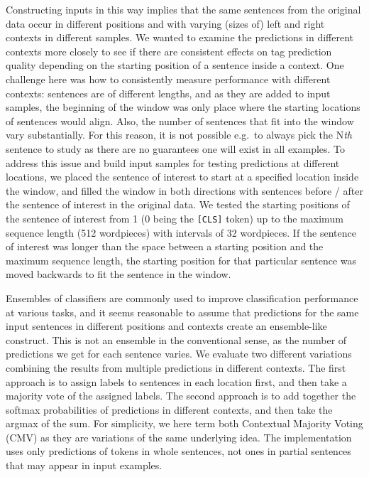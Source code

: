 Constructing inputs in this way implies that the same sentences from the original data occur in different positions and with varying (sizes of) left and right contexts in different samples. We wanted to examine the predictions in different contexts more closely to see if there are consistent effects on tag prediction quality depending on the starting position of a sentence inside a context. One challenge here was how to consistently measure performance with different contexts: sentences are of different lengths, and as they are added to input samples, the beginning of the window was only place where the starting locations of sentences would align. Also, the number of sentences that fit into the window vary substantially. For this reason, it is not possible e.g.\ to always pick the N\emph{th} sentence to study as there are no guarantees one will exist in all examples. To address this issue and build input samples for testing predictions at different locations, we placed the sentence of interest to start at a specified location inside the window, and filled the window in both directions with sentences before / after the sentence of interest in the original data. We tested the starting positions of the sentence of interest from 1 (0 being the \texttt{[CLS]} token) up to the maximum sequence length (512 wordpieces) with intervals of 32 wordpieces. If the sentence of interest was longer than the space between a starting position and the maximum sequence length, the starting position for that particular sentence was moved backwards to fit the sentence in the window. 

Ensembles of classifiers are commonly used to improve classification performance at various tasks, and it seems reasonable to assume that predictions for the same input sentences in different positions and contexts create an ensemble-like construct. This is not an ensemble in the conventional sense, as the number of predictions we get for each sentence varies.
We evaluate two different variations combining the results from multiple predictions in different contexts. The first approach is to assign labels to sentences in each location first, and then take a majority vote of the assigned labels. The second approach is to add together the softmax probabilities of predictions in different contexts, and then take the argmax of the sum. For simplicity, we here term both Contextual Majority Voting (CMV) as they are variations of the same underlying idea. The implementation uses only predictions of tokens in whole sentences, not ones in partial sentences that may appear in input examples. 


